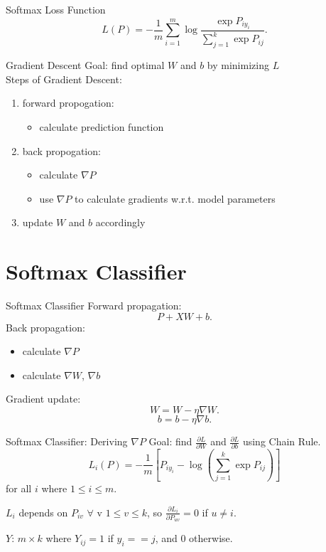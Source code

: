 \documentclass{beamer}
\begin{document}
  \begin{frame}{Softmax Loss Function}
    $$L(P) = -\frac{1}{m} \sum_{i=1}^m \log \frac{\exp{P_{iy_i}}}
              {\sum_{j=1}^k \exp{P_{ij}}}. $$
  \end{frame}

  \begin{frame}{Gradient Descent}
    Goal: find optimal $W$ and $b$ by minimizing $L$\\
    Steps of Gradient Descent:
    \begin{enumerate}
      \item forward propogation: \begin{itemize}
        \item calculate prediction function
      \end{itemize}
      \item back propogation: \begin{itemize}
        \item calculate $\nabla P$
        \item use $\nabla P$ to calculate gradients w.r.t. model parameters
      \end{itemize}
      \item update $W$ and $b$ accordingly
    \end{enumerate}
  \end{frame}

  \section{Softmax Classifier}

  \begin{frame}{Softmax Classifier}
    Forward propagation:
    $$ P + XW + b. $$
    Back propagation:
    \begin{itemize}
      \item calculate $\nabla P$
      \item calculate $\nabla W$, $\nabla b$
    \end{itemize}
    Gradient update:
    $$ W = W - \eta \nabla W. $$
    $$ b = b - \eta \nabla b. $$
  \end{frame}

  \begin{frame}{Softmax Classifier: Deriving $\nabla P$}
    Goal: find $\frac{\partial L}{\partial W}$ and
    $\frac{\partial L}{\partial b}$ using Chain Rule.
    $$ L_i(P) = -\frac{1}{m} \left[ P_{iy_i} - \log\left( \sum_{j=1}^k \exp
    P_{ij} \right)\right] $$ for all $i$ where $1 \leq i \leq m$.

    $L_i$ depends on $P_{iv}$ $\forall$ v $1 \leq v \leq k$,
    so $\frac{\partial L_i}{\partial P_{uv}} = 0$ if $u \neq i$.

    $Y$: $m \times k$ where $Y_{ij} = 1$ if $y_i == j$, and 0 otherwise.

  \end{frame}
\end{document}
